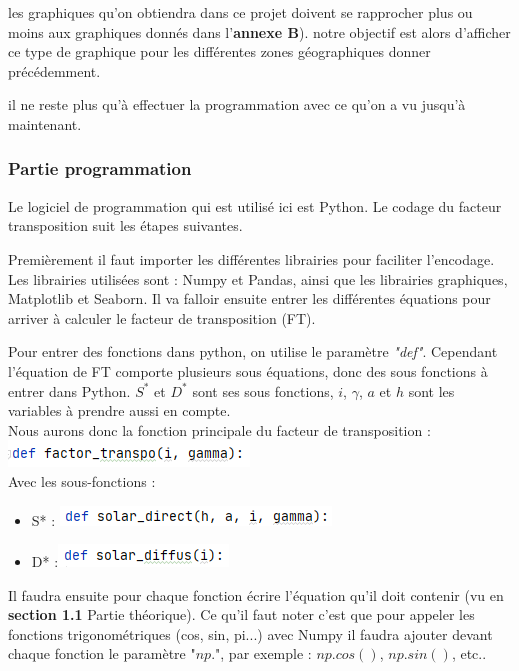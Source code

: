 \documentclass[12pt,a4paper,openright]{report}
\begin{document}
les graphiques qu'on obtiendra dans ce projet doivent se rapprocher plus ou moins aux graphiques donnés dans l'\textbf{annexe B}).
notre objectif est alors d'afficher ce type de graphique pour les différentes zones géographiques donner précédemment.

il ne reste plus qu'à effectuer la programmation avec ce qu'on a vu jusqu'à maintenant.

\subsubsection*{Partie programmation}
Le logiciel de programmation qui est utilisé ici est Python. Le codage du facteur transposition suit les étapes suivantes.

Premièrement il faut importer les différentes librairies pour faciliter l'encodage. Les librairies utilisées sont : Numpy et Pandas, ainsi que les librairies graphiques, Matplotlib et Seaborn.\newline
Il va falloir ensuite entrer les différentes équations pour arriver à calculer le facteur de transposition (FT).

Pour entrer des fonctions dans python, on utilise le paramètre \textit{"def"}. Cependant l'équation de FT comporte plusieurs sous équations, donc des sous fonctions à entrer dans Python. $S^*$ et $D^*$ sont ses sous fonctions, $i$, $\gamma$, $a$ et $h$ sont les variables à prendre aussi en compte.\\
\noindent Nous aurons donc la fonction principale du facteur de transposition :\\
\includegraphics[scale=0.7]{deffact}\\
Avec les sous-fonctions :
\begin{itemize}
\item S* : \includegraphics[scale=0.7]{defsolar}
\item D* :\includegraphics[scale=0.7]{defdiffus}
\end{itemize}
\medskip

Il faudra ensuite pour chaque fonction écrire l'équation qu'il doit contenir (vu en \textbf{section 1.1} Partie théorique). Ce qu'il faut noter c'est que pour appeler les fonctions trigonométriques (cos, sin, pi...) avec Numpy il faudra ajouter devant chaque fonction le paramètre "$np.$", par exemple : $np.cos()$, $np.sin()$, etc..
\end{document}
